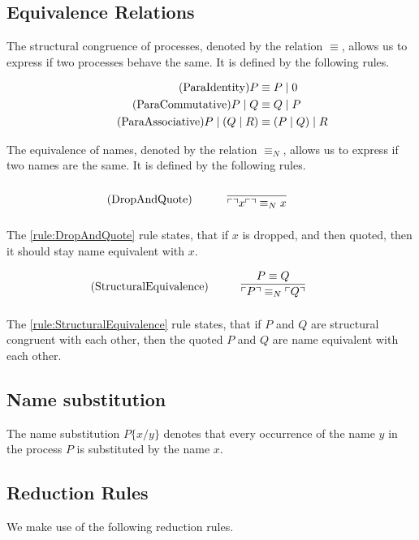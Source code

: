 \subsection{Equivalence Relations}
The structural congruence of processes, denoted by the relation $\equiv$, allows us to express if two processes behave the same. It is defined by the following rules.

\begin{align*}
    \tag{ParaIdentity}P&\equiv P\mid 0\\
    \tag{ParaCommutative}P\mid Q &\equiv Q\mid P\\
    \tag{ParaAssociative}P\mid (Q\mid R)&\equiv (P\mid Q)\mid R
\end{align*}


\FloatBarrier

The equivalence of names, denoted by the relation $\equiv _N$, allows us to express if two names are the same. It is defined by the following rules. 

\begin{align}
    \tag{DropAndQuote}\label{rule:DropAndQuote}\infrule{}{\quot{\drop{x}}\equiv _N x}
\end{align}

\noindent
The \ref{rule:DropAndQuote} rule states, that if $x$ is dropped, and then quoted, then it should stay name equivalent with $x$.

\begin{align}
    \tag{StructuralEquivalence}\label{rule:StructuralEquivalence}\infrule{P\equiv Q}{\quot{P} \equiv _N \quot{Q}}
\end{align}

\noindent
The \ref{rule:StructuralEquivalence} rule states, that if $P$ and $Q$ are structural congruent with each other, then the quoted $P$ and $Q$ are name equivalent with each other.

\FloatBarrier

\subsection{Name substitution} The name substitution $P\{x/y\}$ denotes that every occurrence of the name $y$ in the process $P$ is substituted by the name $x$.

\subsection{Reduction Rules}
We make use of the following reduction rules.

